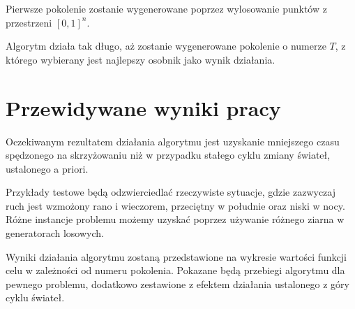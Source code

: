 \documentclass[a4paper]{article}
\begin{document}
Pierwsze pokolenie zostanie wygenerowane poprzez wylosowanie punktów z
przestrzeni $[0, 1]^n$.

Algorytm działa tak długo, aż zostanie wygenerowane pokolenie o numerze $T$,
z którego wybierany jest najlepszy osobnik jako wynik działania.

\section{Przewidywane wyniki pracy}
Oczekiwanym rezultatem działania algorytmu jest uzyskanie mniejszego czasu
spędzonego na skrzyżowaniu niż w przypadku stałego cyklu zmiany świateł,
ustalonego a priori.

Przykłady testowe będą odzwierciedlać rzeczywiste sytuacje, gdzie zazwyczaj
ruch jest wzmożony rano i wieczorem, przeciętny w południe oraz niski w nocy.
Różne instancje problemu możemy uzyskać poprzez używanie różnego ziarna
w generatorach losowych.

Wyniki działania algorytmu zostaną przedstawione na wykresie wartości funkcji
celu w zależności od numeru pokolenia. Pokazane będą przebiegi
algorytmu dla pewnego problemu, dodatkowo zestawione z efektem działania
ustalonego z góry cyklu świateł.
\end{document}
